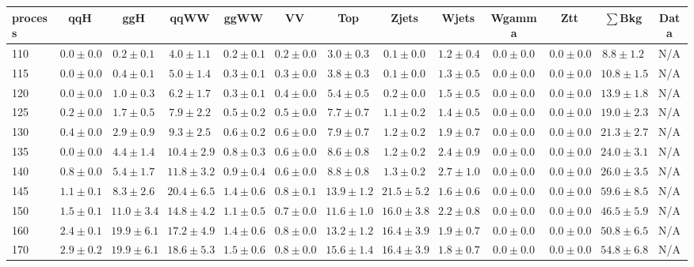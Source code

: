\begin{table}
{%
 \tiny
 \begin{center}
 \begin{tabular}{l | c c | c c c c c c c c  | c c}
 \hline
 process & qqH & ggH & qqWW & ggWW & VV & Top & Zjets & Wjets & Wgamma & Ztt & $\sum$Bkg & Data \\
 \hline
110 & $0.0\pm0.0$ & $0.2\pm0.1$ & $4.0\pm1.1$ & $0.2\pm0.1$ & $0.2\pm0.0$ & $3.0\pm0.3$ & $0.1\pm0.0$ & $1.2\pm0.4$ & $0.0\pm0.0$ & $0.0\pm0.0$ & $8.8\pm1.2$ & N/A \\
115 & $0.0\pm0.0$ & $0.4\pm0.1$ & $5.0\pm1.4$ & $0.3\pm0.1$ & $0.3\pm0.0$ & $3.8\pm0.3$ & $0.1\pm0.0$ & $1.3\pm0.5$ & $0.0\pm0.0$ & $0.0\pm0.0$ & $10.8\pm1.5$ & N/A \\
120 & $0.0\pm0.0$ & $1.0\pm0.3$ & $6.2\pm1.7$ & $0.3\pm0.1$ & $0.4\pm0.0$ & $5.4\pm0.5$ & $0.2\pm0.0$ & $1.5\pm0.5$ & $0.0\pm0.0$ & $0.0\pm0.0$ & $13.9\pm1.8$ & N/A \\
125 & $0.2\pm0.0$ & $1.7\pm0.5$ & $7.9\pm2.2$ & $0.5\pm0.2$ & $0.5\pm0.0$ & $7.7\pm0.7$ & $1.1\pm0.2$ & $1.4\pm0.5$ & $0.0\pm0.0$ & $0.0\pm0.0$ & $19.0\pm2.3$ & N/A \\
130 & $0.4\pm0.0$ & $2.9\pm0.9$ & $9.3\pm2.5$ & $0.6\pm0.2$ & $0.6\pm0.0$ & $7.9\pm0.7$ & $1.2\pm0.2$ & $1.9\pm0.7$ & $0.0\pm0.0$ & $0.0\pm0.0$ & $21.3\pm2.7$ & N/A \\
135 & $0.0\pm0.0$ & $4.4\pm1.4$ & $10.4\pm2.9$ & $0.8\pm0.3$ & $0.6\pm0.0$ & $8.6\pm0.8$ & $1.2\pm0.2$ & $2.4\pm0.9$ & $0.0\pm0.0$ & $0.0\pm0.0$ & $24.0\pm3.1$ & N/A \\
140 & $0.8\pm0.0$ & $5.4\pm1.7$ & $11.8\pm3.2$ & $0.9\pm0.4$ & $0.6\pm0.0$ & $8.8\pm0.8$ & $1.3\pm0.2$ & $2.7\pm1.0$ & $0.0\pm0.0$ & $0.0\pm0.0$ & $26.0\pm3.5$ & N/A \\
145 & $1.1\pm0.1$ & $8.3\pm2.6$ & $20.4\pm6.5$ & $1.4\pm0.6$ & $0.8\pm0.1$ & $13.9\pm1.2$ & $21.5\pm5.2$ & $1.6\pm0.6$ & $0.0\pm0.0$ & $0.0\pm0.0$ & $59.6\pm8.5$ & N/A \\
150 & $1.5\pm0.1$ & $11.0\pm3.4$ & $14.8\pm4.2$ & $1.1\pm0.5$ & $0.7\pm0.0$ & $11.6\pm1.0$ & $16.0\pm3.8$ & $2.2\pm0.8$ & $0.0\pm0.0$ & $0.0\pm0.0$ & $46.5\pm5.9$ & N/A \\
160 & $2.4\pm0.1$ & $19.9\pm6.1$ & $17.2\pm4.9$ & $1.4\pm0.6$ & $0.8\pm0.0$ & $13.2\pm1.2$ & $16.4\pm3.9$ & $1.9\pm0.7$ & $0.0\pm0.0$ & $0.0\pm0.0$ & $50.8\pm6.5$ & N/A \\
170 & $2.9\pm0.2$ & $19.9\pm6.1$ & $18.6\pm5.3$ & $1.5\pm0.6$ & $0.8\pm0.0$ & $15.6\pm1.4$ & $16.4\pm3.9$ & $1.8\pm0.7$ & $0.0\pm0.0$ & $0.0\pm0.0$ & $54.8\pm6.8$ & N/A \\

\end{tabular}
\end{center}}
\end{table}
